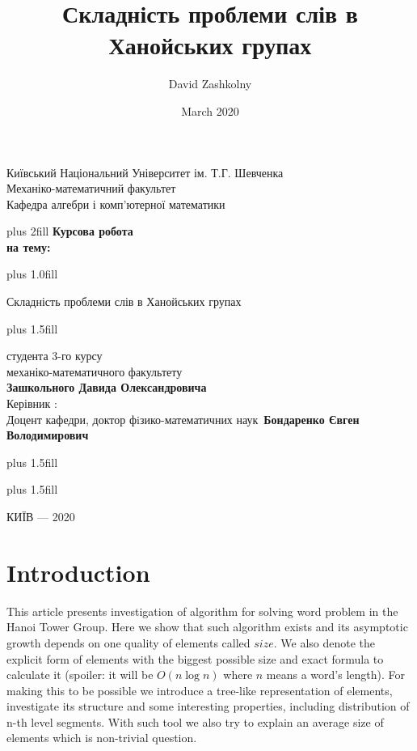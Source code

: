 \documentclass[a4paper,12pt]{amsart}
\title{ 	Складність проблеми слів в Ханойських групах }
\author{ David Zashkolny }
\date{March 2020}
\begin{document}
\thispagestyle {empty}
\begin{center}
	\large  Київський Національний Університет ім. Т.Г. Шевченка \\
	Механіко-математичний факультет \\
	Кафедра алгебри і комп'ютерної математики \par
\end{center}


\begin{center}
	\vskip0cm plus 2fill
	\vspace{2.5cm} {\bf Курсова робота}\\
	
	{\bf на тему:}\\
\end{center}


\vskip0cm plus 1.0fill



\begin{center}\bf
	{\LARGE 
		Складність проблеми слів в Ханойських групах \par}
\end{center}

\vskip0cm plus 1.5fill

\hangindent=7cm  \noindent  
студента 3-го курсу\\
механіко-математичного факультету\\
{\bf Зашкольного Давида Олександровича}\\[2cm]
Керівник :\\
Доцент кафедри, доктор фiзико-математичних наук\
{\bf Бондаренко Євген Володимирович}


\vskip0cm plus 1.5fill

\vskip5cm plus 1.5fill            
\begin{center}
	КИЇВ --- 2020
\end{center}

\newpage
{}

\tableofcontents

\newpage

\section{Introduction}

This article presents investigation of algorithm for solving word problem in 
the Hanoi Tower Group. Here we show that such algorithm exists and its asymptotic growth
depends on one quality of elements called $size$. We also denote the explicit form of 
elements with the biggest possible size and exact formula to calculate it (spoiler: it will 
be $O(n \log n)$ where $n$ means a word's length). For making this to be possible we 
introduce a tree-like representation of elements, investigate its structure and some interesting 
properties, including distribution of n-th level segments. With such tool we also try to 
explain an average size of elements which is non-trivial question.
\end{document}
